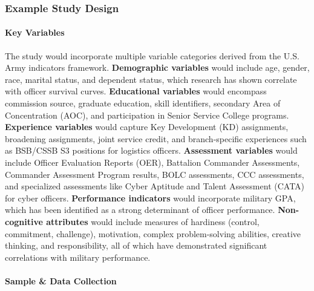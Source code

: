 \documentclass[main.tex]{subfiles}
\begin{document}
\subsubsection{Example Study Design}

\paragraph{Key Variables}

The study would incorporate multiple variable categories derived from the U.S. Army indicators framework. \textbf{Demographic variables} would include age, gender, race, marital status, and dependent status, which research has shown correlate with officer survival curves\parencite{army_indicators}. \textbf{Educational variables} would encompass commission source, graduate education, skill identifiers, secondary Area of Concentration (AOC), and participation in Senior Service College programs\parencite{army_indicators}. \textbf{Experience variables} would capture Key Development (KD) assignments, broadening assignments, joint service credit, and branch-specific experiences such as BSB/CSSB S3 positions for logistics officers\parencite{army_indicators}. \textbf{Assessment variables} would include Officer Evaluation Reports (OER), Battalion Commander Assessments, Commander Assessment Program results, BOLC assessments, CCC assessments, and specialized assessments like Cyber Aptitude and Talent Assessment (CATA) for cyber officers\parencite{army_indicators}. \textbf{Performance indicators} would incorporate military GPA, which has been identified as a strong determinant of officer performance\parencite{army_indicators}. \textbf{Non-cognitive attributes} would include measures of hardiness (control, commitment, challenge), motivation, complex problem-solving abilities, creative thinking, and responsibility, all of which have demonstrated significant correlations with military performance\parencite{army_indicators}.

\paragraph{Sample \& Data Collection}
\end{document}
